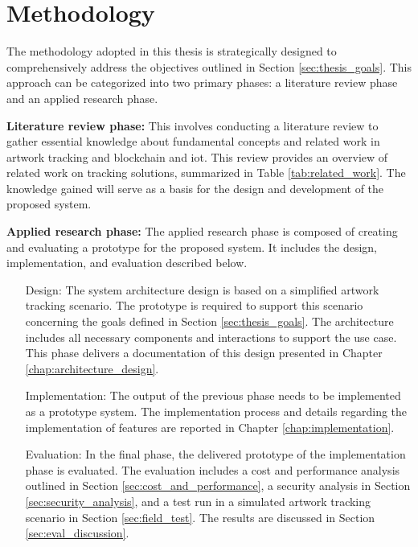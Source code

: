 \section{Methodology} %
The methodology adopted in this thesis is strategically designed to comprehensively address the objectives outlined in Section \ref{sec:thesis_goals}. This approach can be categorized into two primary phases: a literature review phase and an applied research phase.

\textbf{Literature review phase:} This involves conducting a literature review to gather essential knowledge about fundamental concepts and related work in artwork tracking and blockchain and \gls{iot}. This review provides an overview of related work on tracking solutions, summarized in Table \ref{tab:related_work}. The knowledge gained will serve as a basis for the design and development of the proposed system.

\textbf{Applied research phase:} The applied research phase is composed of creating and evaluating a prototype for the proposed system. It includes the design, implementation, and evaluation described below.

\begin{itemize}[font=\itshape, align=left, itemindent=0.5cm]
    \item[Design:] The system architecture design is based on a simplified artwork tracking scenario. The prototype is required to support this scenario concerning the goals defined in Section \ref{sec:thesis_goals}. The architecture includes all necessary components and interactions to support the use case. This phase delivers a documentation of this design presented in Chapter \ref{chap:architecture_design}.
    \item[Implementation:] The output of the previous phase needs to be implemented as a prototype system. The implementation process and details regarding the implementation of features are reported in Chapter \ref{chap:implementation}. 
    \item[Evaluation:] In the final phase, the delivered prototype of the implementation phase is evaluated. The evaluation includes a cost and performance analysis outlined in Section \ref{sec:cost_and_performance}, a security analysis in Section \ref{sec:security_analysis}, and a test run in a simulated artwork tracking scenario in Section \ref{sec:field_test}. The results are discussed in Section \ref{sec:eval_discussion}.
\end{itemize}


